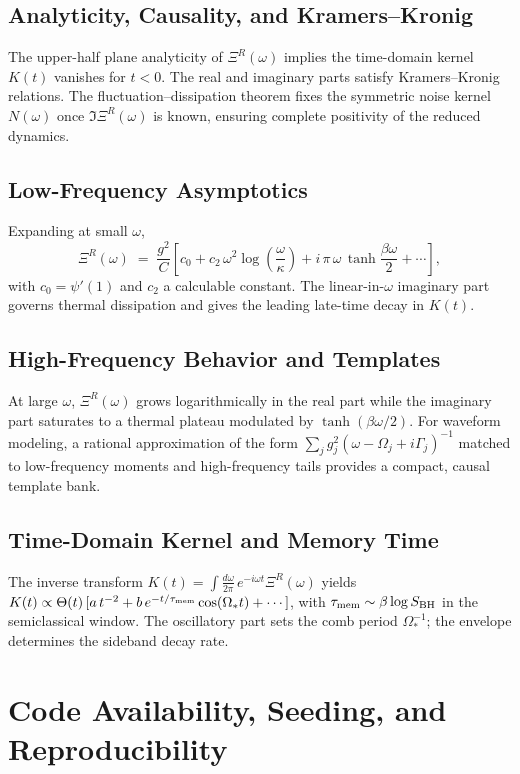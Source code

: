 \documentclass[11pt,a4paper]{article}
\theoremstyle{plain}
\theoremstyle{definition}
\theoremstyle{remark}
\begin{document}
\subsection{Analyticity, Causality, and Kramers--Kronig}
The upper-half plane analyticity of $\Xi^R(\omega)$ implies the time-domain kernel $K(t)$ vanishes for $t<0$. The real and imaginary parts satisfy Kramers--Kronig relations. The fluctuation--dissipation theorem fixes the symmetric noise kernel $N(\omega)$ once $\Im \Xi^R(\omega)$ is known, ensuring complete positivity of the reduced dynamics.

\subsection{Low-Frequency Asymptotics}
Expanding at small $\omega$,
\begin{equation}
\Xi^R(\omega)\;=\;\frac{g^2}{C}\left[c_0 + c_2\,\omega^2\log\!\left(\frac{\omega}{\kappa}\right)+ i\,\pi\,\omega\,\tanh\!\frac{\beta\omega}{2}+\cdots\right],
\end{equation}
with $c_0=\psi'(1)$ and $c_2$ a calculable constant. The linear-in-$\omega$ imaginary part governs thermal dissipation and gives the leading late-time decay in $K(t)$.

\subsection{High-Frequency Behavior and Templates}
At large $\omega$, $\Xi^R(\omega)$ grows logarithmically in the real part while the imaginary part saturates to a thermal plateau modulated by $\tanh(\beta\omega/2)$. For waveform modeling, a rational approximation of the form $\sum_j g_j^2(\omega-\Omega_j+i\Gamma_j)^{-1}$ matched to low-frequency moments and high-frequency tails provides a compact, causal template bank.

\subsection{Time-Domain Kernel and Memory Time}
The inverse transform $K(t)=\int \frac{d\omega}{2\pi}\,e^{-i\omega t}\Xi^R(\omega)$ yields $K(t)\propto \Theta(t)\,[a\,t^{-2}+b\,e^{-t/\tau_{\rm mem}}\cos(\Omega_\ast t)+\cdots]$, with $\tau_{\rm mem}\sim \beta\log S_{\rm BH}$ in the semiclassical window. The oscillatory part sets the comb period $\Omega_\ast^{-1}$; the envelope determines the sideband decay rate.

\section{Code Availability, Seeding, and Reproducibility}\label{app:code}\label{sec:artifact}\label{sec:repro-box} %
\end{document}
